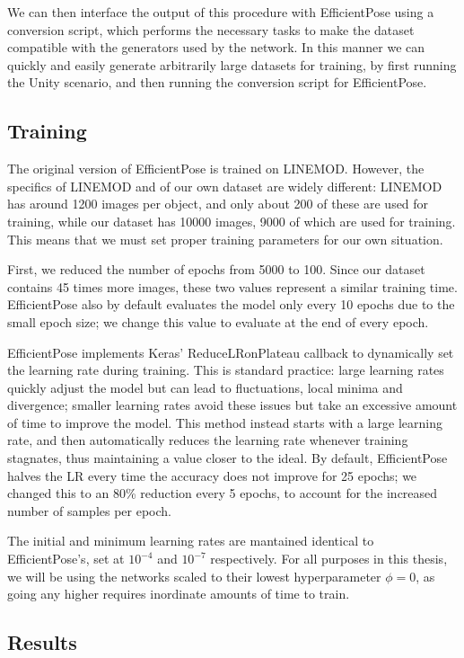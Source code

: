 We can then interface the output of this procedure with EfficientPose using a conversion script, which performs the necessary tasks to make the dataset compatible with the generators used by the network. In this manner we can quickly and easily generate arbitrarily large datasets for training, by first running the Unity scenario, and then running the conversion script for EfficientPose.

\subsection{Training}

The original version of EfficientPose is trained on LINEMOD. However, the specifics of LINEMOD and of our own dataset are widely different: LINEMOD has around 1200 images per object, and only about 200 of these are used for training, while our dataset has 10000 images, 9000 of which are used for training. This means that we must set proper training parameters for our own situation.

First, we reduced the number of epochs from 5000 to 100. Since our dataset contains 45 times more images, these two values represent a similar training time. EfficientPose also by default evaluates the model only every 10 epochs due to the small epoch size; we change this value to evaluate at the end of every epoch.

EfficientPose implements Keras' ReduceLRonPlateau callback to dynamically set the learning rate during training. This is standard practice: large learning rates quickly adjust the model but can lead to fluctuations, local minima and divergence; smaller learning rates avoid these issues but take an excessive amount of time to improve the model\cite{ReduceLR}. This method instead starts with a large learning rate, and then automatically reduces the learning rate whenever training stagnates, thus maintaining a value closer to the ideal. By default, EfficientPose halves the LR every time the accuracy does not improve for 25 epochs; we changed this to an 80\% reduction every 5 epochs, to account for the increased number of samples per epoch.

The initial and minimum learning rates are mantained identical to EfficientPose's, set at $10^{-4}$ and $10^{-7}$ respectively. For all purposes in this thesis, we will be using the networks scaled to their lowest hyperparameter $\phi = 0$, as going any higher requires inordinate amounts of time to train.

\subsection{Results}

